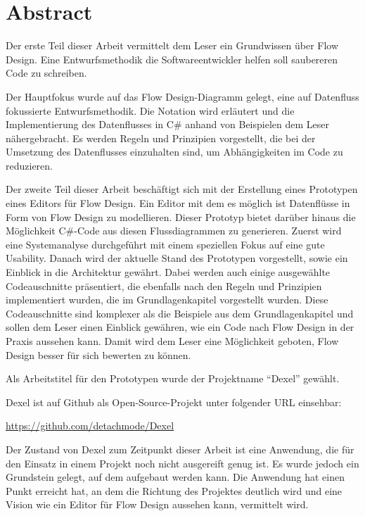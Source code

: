 
\chapter*{Abstract}

Der erste Teil dieser Arbeit vermittelt dem Leser ein Grundwissen über Flow Design. Eine Entwurfsmethodik die Softwareentwickler helfen soll saubereren Code zu schreiben.

Der Hauptfokus wurde auf das Flow Design-Diagramm  gelegt,
eine auf Datenfluss fokussierte Entwurfsmethodik.
Die Notation wird erläutert und die Implementierung des Datenflusses in C\#  anhand von Beispielen dem Leser nähergebracht.
Es werden Regeln und Prinzipien vorgestellt, die bei der Umsetzung des Datenflusses einzuhalten sind, um Abhängigkeiten im Code zu reduzieren.

Der zweite Teil dieser Arbeit beschäftigt sich mit der Erstellung eines Prototypen eines
Editors für Flow Design. Ein Editor mit dem es möglich ist Datenflüsse in Form von Flow Design zu modellieren. Dieser Prototyp bietet darüber hinaus die Möglichkeit C\#-Code aus diesen Flussdiagrammen zu generieren. 
Zuerst wird eine Systemanalyse durchgeführt mit einem
speziellen Fokus auf eine gute Usability.
Danach wird der aktuelle Stand des Prototypen vorgestellt, sowie ein Einblick in die Architektur gewährt. Dabei werden auch einige
ausgewählte Codeauschnitte präsentiert, die ebenfalls nach den Regeln und Prinzipien implementiert wurden, die im Grundlagenkapitel vorgestellt wurden.
Diese Codeauschnitte sind komplexer als die Beispiele aus dem Grundlagenkapitel und sollen dem Leser  einen Einblick gewähren, wie ein Code nach Flow Design in der Praxis aussehen kann.
Damit wird dem Leser eine Möglichkeit geboten, Flow Design besser für sich bewerten zu können.

Als Arbeitstitel für den Prototypen wurde der Projektname \enquote{Dexel} gewählt.

Dexel ist auf Github als Open-Source-Projekt unter folgender URL einsehbar:

\url{https://github.com/detachmode/Dexel}

Der Zustand von Dexel zum Zeitpunkt dieser Arbeit ist eine
Anwendung, die für den Einsatz in einem Projekt noch nicht ausgereift genug ist. 
Es wurde jedoch ein Grundstein gelegt, auf dem aufgebaut werden kann.
Die Anwendung hat einen Punkt erreicht hat, an dem die
Richtung des Projektes deutlich wird und eine Vision wie ein Editor für Flow Design aussehen kann, vermittelt wird.




